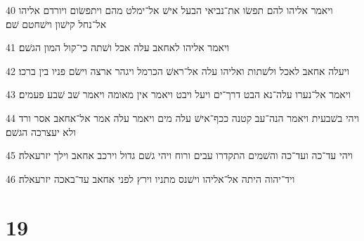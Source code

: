 \par 40 ויאמר אליהו להם תפשׂו את־נביאי הבעל אישׁ אל־ימלט מהם ויתפשׂום ויורדם אליהו אל־נחל קישׁון וישׁחטם שׁם׃
\par 41 ויאמר אליהו לאחאב עלה אכל ושׁתה כי־קול המון הגשׁם׃
\par 42 ויעלה אחאב לאכל ולשׁתות ואליהו עלה אל־ראשׁ הכרמל ויגהר ארצה וישׂם פניו בין ברכו׃
\par 43 ויאמר אל־נערו עלה־נא הבט דרך־ים ויעל ויבט ויאמר אין מאומה ויאמר שׁב שׁבע פעמים׃
\par 44 ויהי בשׁבעית ויאמר הנה־עב קטנה ככף־אישׁ עלה מים ויאמר עלה אמר אל־אחאב אסר ורד ולא יעצרכה הגשׁם׃
\par 45 ויהי עד־כה ועד־כה והשׁמים התקדרו עבים ורוח ויהי גשׁם גדול וירכב אחאב וילך יזרעאלה׃
\par 46 ויד־יהוה היתה אל־אליהו וישׁנס מתניו וירץ לפני אחאב עד־באכה יזרעאלה׃

\chapter{19}

